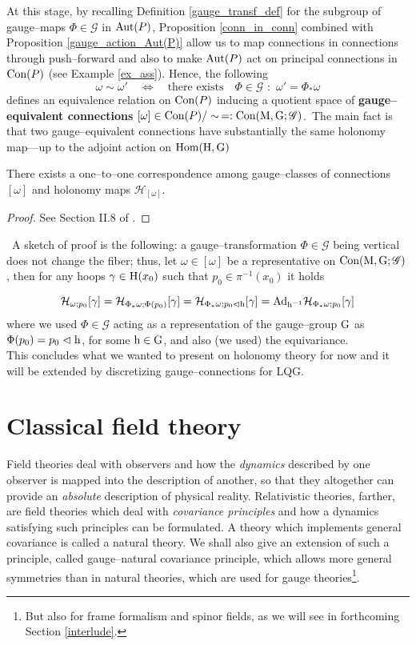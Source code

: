 At this stage, by recalling Definition \ref{gauge_transf_def} for the subgroup of gauge--maps $\Phi\in\mathscr{G}$ in $\text{\normalfont Aut}(P)$, Proposition \ref{conn_in_conn} combined with Proposition \ref{gauge_action_Aut(P)} allow us to map connections in connections through push--forward and also to make $\text{\normalfont Aut}(P)$ act on principal connections in $\text{\normalfont Con}(P)$ (see Example \ref{ex_ass}). Hence, the following
$$\omega\sim\omega'\quad\Leftrightarrow\quad\text{there exists}\quad\Phi\in\mathscr{G}\,\,:\,\,\omega'=\Phi_*\omega$$
defines an equivalence relation on $\text{\normalfont Con}(P)$ inducing a quotient space of \textbf{gauge--equivalent connections} $[\omega]\in\text{\normalfont Con}(P)/\sim\,=:\text{\normalfont Con}(\text{\normalfont M},\text{\normalfont G};\mathscr{G})$.\, The main fact is that two gauge--equivalent connections have substantially the same holonomy map---up to the adjoint action on $\text{\normalfont Hom}(\text{\normalfont H},\text{\normalfont G})$

\begin{teo}\label{holonomy_repr_conn}
    There exists a one--to--one correspondence among gauge--classes of connections $[\omega]$ and holonomy maps $\mathcal{H}_{[\omega]}.$
\end{teo}
\begin{proof}
    See Section II.8 of \cite{kobayashi1}.
\end{proof}
\,\newline
A sketch of proof is the following: a gauge--transformation $\Phi\in\mathscr{G}$ being vertical does not change the fiber; thus, let $\omega\in[\omega]$ be a representative on $\text{\normalfont Con}(\text{\normalfont M},\text{\normalfont G};\mathscr{G})$, then for any hoops $\gamma\in\text{\normalfont H}(x_0)$ such that $p_0\in\pi^{-1}(x_0)$ it holds

$$\mathcal{H}_{\omega;p_0}[\gamma]=\mathcal{H}_{\Phi_*\omega;\Phi(p_0)}[\gamma]=\mathcal{H}_{\Phi_*\omega;p_0\vartriangleleft\text{\normalfont h}}[\gamma]=\text{\normalfont Ad}_{\text{\normalfont h}^{-1}}\mathcal{H}_{\Phi_*\omega;p_0}[\gamma]$$
where we used $\Phi\in\mathscr{G}$ acting as a representation of the gauge--group $\text{\normalfont G}$ as $\Phi(p_0)=p_0\vartriangleleft\text{\normalfont h}$, for some $\text{\normalfont h}\in\text{\normalfont G}$, and also (we used) the equivariance.\\

This concludes what we wanted to present on holonomy theory for now and it will be extended by discretizing gauge--connections for LQG.

\newpage
\section{Classical field theory}

Field theories deal with observers and how  the \emph{dynamics} described by one observer is mapped into the description of another, so that they altogether can provide an \emph{absolute} description of physical reality. Relativistic theories, farther, are field theories which deal with \emph{covariance principles} and how a dynamics satisfying such principles can be formulated. A theory which implements general covariance is called a natural theory. We shall also give an extension of such a principle, called gauge--natural covariance principle, which allows more general symmetries than in natural theories, which are used for gauge theories\footnote{But also for frame formalism and spinor fields, as we will see in forthcoming Section \ref{interlude}.}. 

